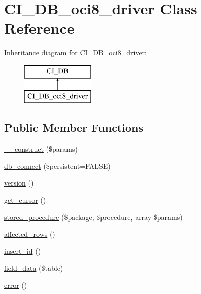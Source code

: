 \hypertarget{class_c_i___d_b__oci8__driver}{}\section{C\+I\+\_\+\+D\+B\+\_\+oci8\+\_\+driver Class Reference}
\label{class_c_i___d_b__oci8__driver}
Inheritance diagram for C\+I\+\_\+\+D\+B\+\_\+oci8\+\_\+driver\+:\begin{figure}[H]
\begin{center}
\leavevmode
\includegraphics[height=2.000000cm]{class_c_i___d_b__oci8__driver}
\end{center}
\end{figure}
\subsection*{Public Member Functions}
\begin{DoxyCompactItemize}
\item 
\mbox{\hyperlink{class_c_i___d_b__oci8__driver_a2b3f9729c63ae392c0f6b43f6adc14a5}{\+\_\+\+\_\+construct}} (\$params)
\item 
\mbox{\hyperlink{class_c_i___d_b__oci8__driver_a9e509db34aa9a73203e62ba3bcd10ba2}{db\+\_\+connect}} (\$persistent=F\+A\+L\+SE)
\item 
\mbox{\hyperlink{class_c_i___d_b__oci8__driver_ad6da17628cb50593e66b28bbe9a46fce}{version}} ()
\item 
\mbox{\hyperlink{class_c_i___d_b__oci8__driver_a78dcbceb7d8a821bf223630ce27a72de}{get\+\_\+cursor}} ()
\item 
\mbox{\hyperlink{class_c_i___d_b__oci8__driver_a9fc7ddb9c8c0379dfe516d063c3059fe}{stored\+\_\+procedure}} (\$package, \$procedure, array \$params)
\item 
\mbox{\hyperlink{class_c_i___d_b__oci8__driver_a1bdcd4a4f333b1ecd3ffcd808de137b3}{affected\+\_\+rows}} ()
\item 
\mbox{\hyperlink{class_c_i___d_b__oci8__driver_ad358e7c4bab8c55d9397b51112ec5ac3}{insert\+\_\+id}} ()
\item 
\mbox{\hyperlink{class_c_i___d_b__oci8__driver_a3c875d27a5c26a83e6d005a34bbfdf54}{field\+\_\+data}} (\$table)
\item 
\mbox{\hyperlink{class_c_i___d_b__oci8__driver_aa0479e1c0c3ce65a16aa3f4abf583a73}{error}} ()
\end{DoxyCompactItemize}
